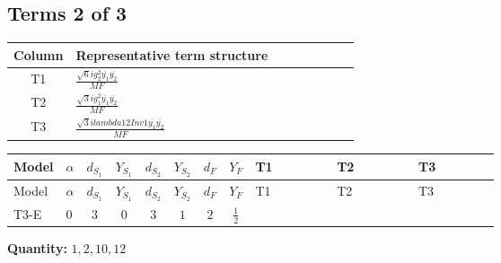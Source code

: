 \documentclass[8pt]{article}
\begin{document}
\begin{landscape}
\subsection*{Terms 2 of 3}
\begin{center}
\begin{tabular}{@{}c >{\raggedright\arraybackslash}p{0.82\linewidth}@{}}
\toprule
Column & Representative term structure \\
\midrule
T1 & \(\displaystyle \frac{\sqrt{6} i g_{2}^{2} \overline{y_{1}} \overline{y_{2}}}{MF}\) \\
\midrule
T2 & \(\displaystyle \frac{\sqrt{3} i g_{1}^{2} \overline{y_{1}} \overline{y_{2}}}{MF}\) \\
\midrule
T3 & \(\displaystyle \frac{\sqrt{3} i lambda12Inv1 \overline{y_{1}} \overline{y_{2}}}{MF}\) \\
\midrule
\bottomrule
\end{tabular}
\end{center}
\smallskip
\tiny
\begin{longtable}{@{}llcccccc >{\raggedright\arraybackslash}p{0.21\linewidth} >{\raggedright\arraybackslash}p{0.21\linewidth} >{\raggedright\arraybackslash}p{0.21\linewidth}@{}}
\toprule
Model & $\alpha$ & $d_{S_1}$ & $Y_{S_1}$ & $d_{S_2}$ & $Y_{S_2}$ & $d_F$ & $Y_F$ & T1 & T2 & T3 \\
\midrule
\endfirsthead
\toprule
Model & $\alpha$ & $d_{S_1}$ & $Y_{S_1}$ & $d_{S_2}$ & $Y_{S_2}$ & $d_F$ & $Y_F$ & T1 & T2 & T3 \\
\midrule
\endhead
T3-E & $0$ & $3$ & $0$ & $3$ & $1$ & $2$ & $\frac{1}{2}$ & \scriptsize\adjustbox{max width=\linewidth}{$\begin{gathered} - \frac{\sqrt{6} i g_{2}^{2} \overline{y_{1}} \overline{y_{2}}}{6 MF}\end{gathered}$} & \scriptsize\adjustbox{max width=\linewidth}{$\begin{gathered} - \frac{\sqrt{3} i g_{1}^{2} \overline{y_{1}} \overline{y_{2}}}{8 MF}\end{gathered}$} & \scriptsize\adjustbox{max width=\linewidth}{$\begin{gathered} \frac{\sqrt{3} i lambda12Inv1 \overline{y_{1}} \overline{y_{2}}}{6 MF}\end{gathered}$} \\
\midrule
\bottomrule
\end{longtable}
\clearpage
\noindent\textbf{Quantity: }$\mathrm{1,2,10,12}$\par\smallskip

\end{landscape}
\end{document}
